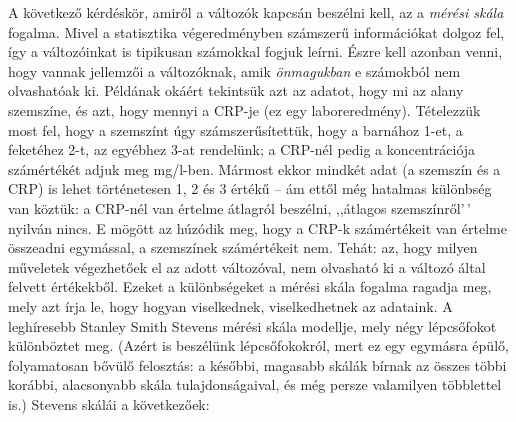 \documentclass[
]{book}
\begin{document}
A következő kérdéskör, amiről a változók kapcsán beszélni kell, az a \emph{mérési skála} fogalma. Mivel a statisztika végeredményben számszerű információkat dolgoz fel, így a változóinkat is tipikusan számokkal fogjuk leírni. Észre kell azonban venni, hogy vannak jellemzői a változóknak, amik \emph{önmagukban} e számokból nem olvashatóak ki. Példának okáért tekintsük azt az adatot, hogy mi az alany szemszíne, és azt, hogy mennyi a CRP-je (ez egy laboreredmény). Tételezzük most fel, hogy a szemszínt úgy számszerűsítettük, hogy a barnához 1-et, a feketéhez 2-t, az egyébhez 3-at rendelünk; a CRP-nél pedig a koncentrációja számértékét adjuk meg mg/l-ben. Mármost ekkor mindkét adat (a szemszín és a CRP) is lehet történetesen 1, 2 és 3 értékű -- ám ettől még hatalmas különbség van köztük: a CRP-nél van értelme átlagról beszélni, ,,átlagos szemszínről'\,' nyilván nincs. E mögött az húzódik meg, hogy a CRP-k számértékeit van értelme összeadni egymással, a szemszínek számértékeit nem. Tehát: az, hogy milyen műveletek végezhetőek el az adott változóval, nem olvasható ki a változó által felvett értékekből. Ezeket a különbségeket a mérési skála fogalma ragadja meg, mely azt írja le, hogy hogyan viselkednek, viselkedhetnek az adataink. A leghíresebb Stanley Smith Stevens mérési skála modellje, mely négy lépcsőfokot különböztet meg. (Azért is beszélünk lépcsőfokokról, mert ez egy egymásra épülő, folyamatosan bővülő felosztás: a későbbi, magasabb skálák bírnak az összes többi korábbi, alacsonyabb skála tulajdonságaival, és még persze valamilyen többlettel is.) Stevens skálái a következőek:
\end{document}
